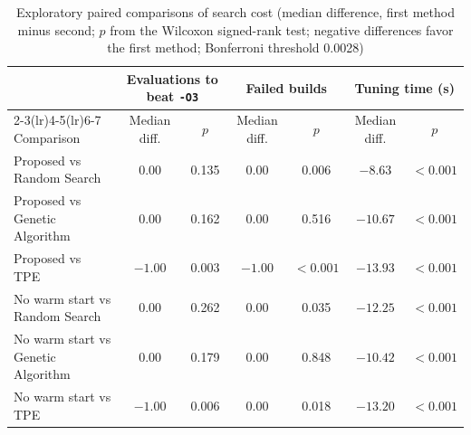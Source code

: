 \begin{table}[t]
\caption{Exploratory paired comparisons of search cost (median difference, first method minus second; $p$ from the Wilcoxon signed-rank test; negative differences favor the first method; Bonferroni threshold 0.0028)}
\label{tab:explore}
\centering\small
\begin{tabular}{@{}lcccccc@{}}
\toprule
 & \multicolumn{2}{c}{Evaluations to beat \texttt{-O3}} & \multicolumn{2}{c}{Failed builds} & \multicolumn{2}{c}{Tuning time (s)}\\
\cmidrule(lr){2-3}\cmidrule(lr){4-5}\cmidrule(lr){6-7}
Comparison & Median diff. & $p$ & Median diff. & $p$ & Median diff. & $p$\\
\midrule
Proposed vs Random Search & 0.00 & 0.135 & 0.00 & 0.006 & $-8.63$ & $<0.001$\\
Proposed vs Genetic Algorithm & 0.00 & 0.162 & 0.00 & 0.516 & $-10.67$ & $<0.001$\\
Proposed vs TPE & $-1.00$ & 0.003 & $-1.00$ & $<0.001$ & $-13.93$ & $<0.001$\\
No warm start vs Random Search & 0.00 & 0.262 & 0.00 & 0.035 & $-12.25$ & $<0.001$\\
No warm start vs Genetic Algorithm & 0.00 & 0.179 & 0.00 & 0.848 & $-10.42$ & $<0.001$\\
No warm start vs TPE & $-1.00$ & 0.006 & 0.00 & 0.018 & $-13.20$ & $<0.001$\\
\bottomrule
\end{tabular}
\end{table}

